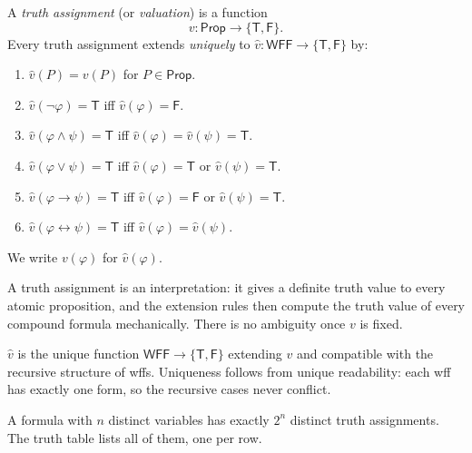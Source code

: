 \begin{tcolorbox}[colback=propbox, colframe=propborder, arc=2pt,
  left=6pt, right=6pt, top=4pt, bottom=4pt,
  title={\small\textbf{Definition (Truth Assignment)}},
  fonttitle=\small\bfseries]
\label{def:truth-assign}
A \emph{truth assignment} (or \emph{valuation}) is a function
\[
v : \mathsf{Prop} \to \{\mathsf{T}, \mathsf{F}\}.
\]
Every truth assignment extends \emph{uniquely} to
$\hat{v} : \mathsf{WFF} \to \{\mathsf{T}, \mathsf{F}\}$ by:
\begin{enumerate}
  \item $\hat{v}(P) = v(P)$ for $P \in \mathsf{Prop}$.
  \item $\hat{v}(\neg\varphi) = \mathsf{T}$ iff $\hat{v}(\varphi) = \mathsf{F}$.
  \item $\hat{v}(\varphi \wedge \psi) = \mathsf{T}$ iff $\hat{v}(\varphi) = \hat{v}(\psi) = \mathsf{T}$.
  \item $\hat{v}(\varphi \vee \psi) = \mathsf{T}$ iff $\hat{v}(\varphi) = \mathsf{T}$ or $\hat{v}(\psi) = \mathsf{T}$.
  \item $\hat{v}(\varphi \rightarrow \psi) = \mathsf{T}$ iff $\hat{v}(\varphi) = \mathsf{F}$ or $\hat{v}(\psi) = \mathsf{T}$.
  \item $\hat{v}(\varphi \leftrightarrow \psi) = \mathsf{T}$ iff $\hat{v}(\varphi) = \hat{v}(\psi)$.
\end{enumerate}
We write $v(\varphi)$ for $\hat{v}(\varphi)$.
\end{tcolorbox}

\begin{remark}
A truth assignment is an interpretation: it gives a definite truth value to
every atomic proposition, and the extension rules then compute the truth value
of every compound formula mechanically. There is no ambiguity once $v$ is fixed.
\end{remark}

\begin{remark}
$\hat{v}$ is the unique function $\mathsf{WFF} \to \{\mathsf{T},\mathsf{F}\}$
extending $v$ and compatible with the recursive structure of wffs.
Uniqueness follows from unique readability: each wff has exactly one form,
so the recursive cases never conflict.
\end{remark}

\begin{remark}
A formula with $n$ distinct variables has exactly $2^n$ distinct truth
assignments. The truth table lists all of them, one per row.
\end{remark}

